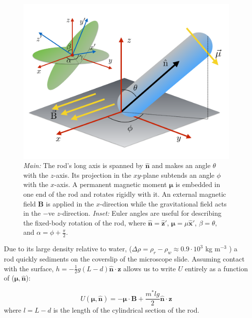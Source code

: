 \documentclass[aps,prl,twocolumn,superscriptaddress]{revtex4-1}
\newcommand{\vcrm}[1]{\mathbf{#1}}
\newcommand{\hvcrm}[1]{\mathbf{\hat{#1}}}
\newcommand{\vc}[1]{\boldsymbol{#1}}
\begin{document}
\begin{figure}
		\includegraphics[width=0.8\columnwidth]{figs/geometry.pdf}
	\caption{\footnotesize \emph{Main:} The rod's long axis is spanned by $\hvcrm{n}$ and makes an angle $\theta$ with the $z$-axis. Its projection in the $xy$-plane subtends an angle $\phi$ with the $x$-axis. A permanent magnetic moment $\vc{\mu}$ is embedded in one end of the rod and rotates rigidly with it. An external magnetic field $\vcrm{B}$ is applied in the $x$-direction while the gravitational field acts in the $-$ve $z$-direction. \emph{Inset:} Euler angles are useful for describing the fixed-body rotation of the rod, where $\hvcrm{n}=\hvcrm{z}'$, $\vc{\mu}=\mu\hvcrm{x}'$, $\beta=\theta$, and $\alpha=\phi+\frac{\pi}{2}$.\label{fig:geometry}}
\end{figure}


Due to its large density relative to water, ($\Delta\rho = \rho_r - \rho_w \approx 0.9 \cdot 10^3$ kg m$^{-3}$ \cite{Kuijk2011}) a rod quickly sediments on the coverslip of the microscope slide. Assuming contact with the surface, $h=-\frac{1}{2}g(L-d)\hvcrm{n}\cdot\vc{z}$ allows us to write $U$ entirely as a function of ($\vc{\mu},\hvcrm{n}$):

\begin{equation}\label{energy}
U(\vc{\mu},\hvcrm{n})= -\vc{\mu}\cdot\vcrm{B} + \frac{m^* l g}{2}  \hvcrm{n}\cdot\vc{z}
\end{equation}where $l=L-d$ is the length of the cylindrical section of the rod.
\end{document}
